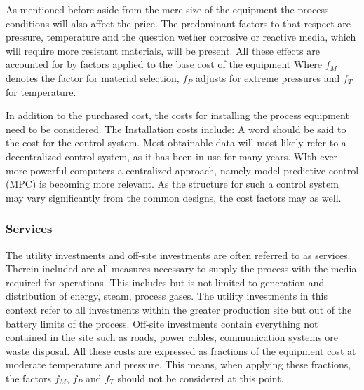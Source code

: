As mentioned before aside from the mere size of the equipment the process conditions will also affect the 
price. The predominant factors to that respect are pressure, temperature and the question wether corrosive 
or reactive media, which will require more resistant materials, will be present. All these effects are
accounted for by factors applied to the base cost of the equipment
%
Where $f_M$ denotes the factor for material selection, $f_P$ adjusts for extreme pressures and 
$f_T$ for temperature. 

In addition to the purchased cost, the costs for installing the process equipment need to be considered. 
The Installation costs include:
%
A word should be said to the cost for the control system. Most obtainable data will most likely refer to 
a decentralized control system, as it has been in use for many years. WIth ever more powerful computers 
a centralized approach, namely model predictive control (MPC) is becoming more relevant. As the 
structure for such a control system may vary significantly from the common designs, the cost factors may 
as well. 
 
\subsubsection{Services}
The utility investments and off-site investments are often referred to as services. Therein included are
all measures necessary to supply the process with the media required for operations. This includes but is
not limited to generation and distribution of energy, steam, process gases. The utility investments  
in this context refer to all investments within the greater production site but out of the battery limits of the 
process. Off-site investments contain everything not contained in the site such as roads, power cables,
communication systems ore waste disposal. All these costs are expressed as fractions of the equipment 
cost at moderate temperature and pressure. This means, when applying these fractions, the factors $f_M$, 
$f_P$ and $f_T$ should not be considered at this point. 

